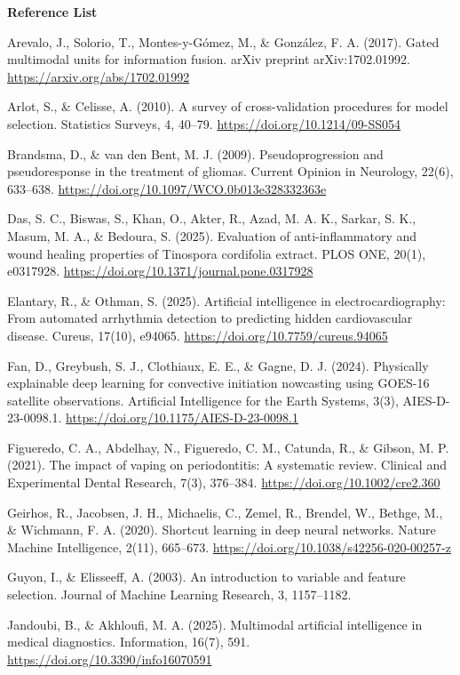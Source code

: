 \documentclass[
]{article}
\begin{document}
\textbf{Reference List}

Arevalo, J., Solorio, T., Montes-y-Gómez, M., \& González, F. A. (2017).
Gated multimodal units for information fusion. arXiv preprint
arXiv:1702.01992. \url{https://arxiv.org/abs/1702.01992}

Arlot, S., \& Celisse, A. (2010). A survey of cross-validation
procedures for model selection. Statistics Surveys, 4, 40--79.
\url{https://doi.org/10.1214/09-SS054}

Brandsma, D., \& van den Bent, M. J. (2009). Pseudoprogression and
pseudoresponse in the treatment of gliomas. Current Opinion in
Neurology, 22(6), 633--638.
\url{https://doi.org/10.1097/WCO.0b013e328332363e}

Das, S. C., Biswas, S., Khan, O., Akter, R., Azad, M. A. K., Sarkar, S.
K., Masum, M. A., \& Bedoura, S. (2025). Evaluation of anti-inflammatory
and wound healing properties of Tinospora cordifolia extract. PLOS ONE,
20(1), e0317928. \url{https://doi.org/10.1371/journal.pone.0317928}

Elantary, R., \& Othman, S. (2025). Artificial intelligence in
electrocardiography: From automated arrhythmia detection to predicting
hidden cardiovascular disease. Cureus, 17(10), e94065.
\url{https://doi.org/10.7759/cureus.94065}

Fan, D., Greybush, S. J., Clothiaux, E. E., \& Gagne, D. J. (2024).
Physically explainable deep learning for convective initiation
nowcasting using GOES-16 satellite observations. Artificial Intelligence
for the Earth Systems, 3(3), AIES-D-23-0098.1.
\url{https://doi.org/10.1175/AIES-D-23-0098.1}

Figueredo, C. A., Abdelhay, N., Figueredo, C. M., Catunda, R., \&
Gibson, M. P. (2021). The impact of vaping on periodontitis: A
systematic review. Clinical and Experimental Dental Research, 7(3),
376--384. \url{https://doi.org/10.1002/cre2.360}

Geirhos, R., Jacobsen, J. H., Michaelis, C., Zemel, R., Brendel, W.,
Bethge, M., \& Wichmann, F. A. (2020). Shortcut learning in deep neural
networks. Nature Machine Intelligence, 2(11), 665--673.
\url{https://doi.org/10.1038/s42256-020-00257-z}

Guyon, I., \& Elisseeff, A. (2003). An introduction to variable and
feature selection. Journal of Machine Learning Research, 3, 1157--1182.

Jandoubi, B., \& Akhloufi, M. A. (2025). Multimodal artificial
intelligence in medical diagnostics. Information, 16(7), 591.
\url{https://doi.org/10.3390/info16070591}
\end{document}
